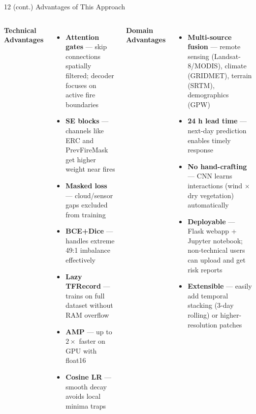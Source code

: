 ﻿\documentclass[aspectratio=169,t]{beamer}
\begin{document}
\begin{frame}{12 (cont.) Advantages of This Approach}
\begin{columns}[t]
\textcolor{accentgreen}{\textbf{Technical Advantages}}
\begin{itemize}\small
  \item \textbf{Attention gates} --- skip connections spatially filtered; decoder focuses on active fire boundaries
  \item \textbf{SE blocks} --- channels like ERC and PrevFireMask get higher weight near fires
  \item \textbf{Masked loss} --- cloud/sensor gaps excluded from training
  \item \textbf{BCE+Dice} --- handles extreme 49:1 imbalance effectively
  \item \textbf{Lazy TFRecord} --- trains on full dataset without RAM overflow
  \item \textbf{AMP} --- up to $2\times$ faster on GPU with float16
  \item \textbf{Cosine LR} --- smooth decay avoids local minima traps
\end{itemize}
\textcolor{accent}{\textbf{Domain Advantages}}
\begin{itemize}\small
  \item \textbf{Multi-source fusion} --- remote sensing (Landsat-8/MODIS), climate (GRIDMET), terrain (SRTM), demographics (GPW)
  \item \textbf{24 h lead time} --- next-day prediction enables timely response
  \item \textbf{No hand-crafting} --- CNN learns interactions (wind $\times$ dry vegetation) automatically
  \item \textbf{Deployable} --- Flask webapp + Jupyter notebook; non-technical users can upload and get risk reports
  \item \textbf{Extensible} --- easily add temporal stacking (3-day rolling) or higher-resolution patches
\end{itemize}
\end{columns}
\end{frame}
\end{document}
